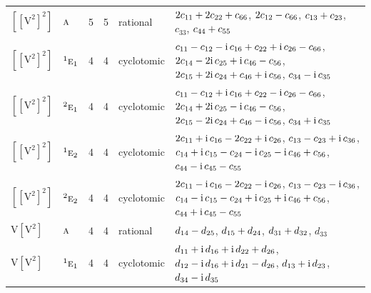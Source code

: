 \documentclass[10pt,a4paper]{article}
\numberwithin{equation}{section}
\newcommand{\irr}[1]{\text{\normalfont\scshape #1}}
\newcommand{\conjpair}[1]{{}^{#1}}
\newcommand{\iunit}{\mathrm{i}}
\newcommand{\jahn}[1]{\mathrm{#1}}
\newlength{\fillwidth}\newlength{\cellwidth}\newlength{\colwidth}
\newcommand{\signbreak}{\penalty100\relax}
\begin{document}
{\begin{longtable}{@{}llrrl>{\RaggedRight\arraybackslash}p{\fillwidth}@{}}
$\jahn{[[V^{2}]^{2}]}$ & $\irr{a}$ & 5 & 5 & rational & $2c_{11} +\signbreak 2c_{22} +\signbreak c_{66}$, $2c_{12} -\signbreak c_{66}$, $c_{13} +\signbreak c_{23}$, $c_{33}$, $c_{44} +\signbreak c_{55}$\\
$\jahn{[[V^{2}]^{2}]}$ & $\conjpair{1}\irr{e}_{1}$ & 4 & 4 & cyclotomic & $c_{11} -\signbreak c_{12} -\signbreak \iunit{}\,c_{16} +\signbreak c_{22} +\signbreak \iunit{}\,c_{26} -\signbreak c_{66}$, $2c_{14} -\signbreak 2\iunit{}\,c_{25} +\signbreak \iunit{}\,c_{46} -\signbreak c_{56}$, $2c_{15} +\signbreak 2\iunit{}\,c_{24} +\signbreak c_{46} +\signbreak \iunit{}\,c_{56}$, $c_{34} -\signbreak \iunit{}\,c_{35}$\\
$\jahn{[[V^{2}]^{2}]}$ & $\conjpair{2}\irr{e}_{1}$ & 4 & 4 & cyclotomic & $c_{11} -\signbreak c_{12} +\signbreak \iunit{}\,c_{16} +\signbreak c_{22} -\signbreak \iunit{}\,c_{26} -\signbreak c_{66}$, $2c_{14} +\signbreak 2\iunit{}\,c_{25} -\signbreak \iunit{}\,c_{46} -\signbreak c_{56}$, $2c_{15} -\signbreak 2\iunit{}\,c_{24} +\signbreak c_{46} -\signbreak \iunit{}\,c_{56}$, $c_{34} +\signbreak \iunit{}\,c_{35}$\\
$\jahn{[[V^{2}]^{2}]}$ & $\conjpair{1}\irr{e}_{2}$ & 4 & 4 & cyclotomic & $2c_{11} +\signbreak \iunit{}\,c_{16} -\signbreak 2c_{22} +\signbreak \iunit{}\,c_{26}$, $c_{13} -\signbreak c_{23} +\signbreak \iunit{}\,c_{36}$, $c_{14} +\signbreak \iunit{}\,c_{15} -\signbreak c_{24} -\signbreak \iunit{}\,c_{25} -\signbreak \iunit{}\,c_{46} +\signbreak c_{56}$, $c_{44} -\signbreak \iunit{}\,c_{45} -\signbreak c_{55}$\\
$\jahn{[[V^{2}]^{2}]}$ & $\conjpair{2}\irr{e}_{2}$ & 4 & 4 & cyclotomic & $2c_{11} -\signbreak \iunit{}\,c_{16} -\signbreak 2c_{22} -\signbreak \iunit{}\,c_{26}$, $c_{13} -\signbreak c_{23} -\signbreak \iunit{}\,c_{36}$, $c_{14} -\signbreak \iunit{}\,c_{15} -\signbreak c_{24} +\signbreak \iunit{}\,c_{25} +\signbreak \iunit{}\,c_{46} +\signbreak c_{56}$, $c_{44} +\signbreak \iunit{}\,c_{45} -\signbreak c_{55}$\\
$\jahn{V[V^{2}]}$ & $\irr{a}$ & 4 & 4 & rational & $d_{14} -\signbreak d_{25}$, $d_{15} +\signbreak d_{24}$, $d_{31} +\signbreak d_{32}$, $d_{33}$\\
$\jahn{V[V^{2}]}$ & $\conjpair{1}\irr{e}_{1}$ & 4 & 4 & cyclotomic & $d_{11} +\signbreak \iunit{}\,d_{16} +\signbreak \iunit{}\,d_{22} +\signbreak d_{26}$, $d_{12} -\signbreak \iunit{}\,d_{16} +\signbreak \iunit{}\,d_{21} -\signbreak d_{26}$, $d_{13} +\signbreak \iunit{}\,d_{23}$, $d_{34} -\signbreak \iunit{}\,d_{35}$\\

\end{longtable}}
\end{document}
